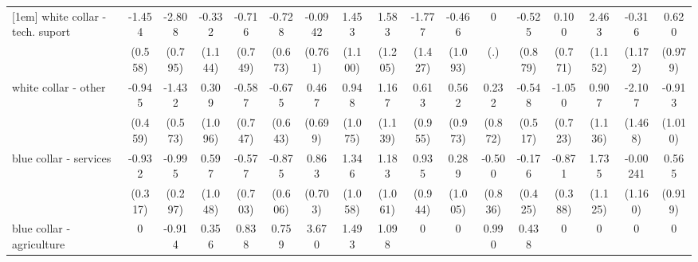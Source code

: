 {\begin{tabular}{l*{16}{c}}
[1em]
white collar - tech. suport&      -1.454\sym{**} &      -2.808\sym{***}&      -0.332         &      -0.716         &      -0.728         &     -0.0942         &       1.453         &       1.583         &      -1.777         &      -0.466         &           0         &      -0.525         &       0.100         &       2.463\sym{*}  &      -0.316         &       0.620         \\
                    &     (0.558)         &     (0.795)         &     (1.144)         &     (0.749)         &     (0.673)         &     (0.761)         &     (1.100)         &     (1.205)         &     (1.427)         &     (1.093)         &         (.)         &     (0.879)         &     (0.771)         &     (1.152)         &     (1.172)         &     (0.979)         \\
[1em]
white collar - other&      -0.945\sym{*}  &      -1.432\sym{*}  &       0.309         &      -0.587         &      -0.675         &       0.467         &       0.948         &       1.167         &       0.613         &       0.562         &       0.232         &      -0.548         &      -1.050         &       0.907         &      -2.107         &      -0.913         \\
                    &     (0.459)         &     (0.573)         &     (1.096)         &     (0.747)         &     (0.643)         &     (0.699)         &     (1.075)         &     (1.139)         &     (0.955)         &     (0.973)         &     (0.872)         &     (0.517)         &     (0.723)         &     (1.136)         &     (1.468)         &     (1.010)         \\
[1em]
blue collar - services&      -0.932\sym{**} &      -0.995\sym{***}&       0.597         &      -0.577         &      -0.875         &       0.863         &       1.346         &       1.183         &       0.935         &       0.289         &      -0.500         &      -0.176         &      -0.871\sym{*}  &       1.735         &    -0.00241         &       0.565         \\
                    &     (0.317)         &     (0.297)         &     (1.048)         &     (0.703)         &     (0.606)         &     (0.703)         &     (1.058)         &     (1.061)         &     (0.944)         &     (1.005)         &     (0.836)         &     (0.425)         &     (0.388)         &     (1.125)         &     (1.160)         &     (0.919)         \\
[1em]
blue collar - agriculture&           0         &      -0.914         &       0.356         &       0.838         &       0.759         &       3.670\sym{*}  &       1.493         &       1.098         &           0         &           0         &       0.990         &       0.438         &           0         &           0         &           0         &           0         \\

\end{tabular}}
